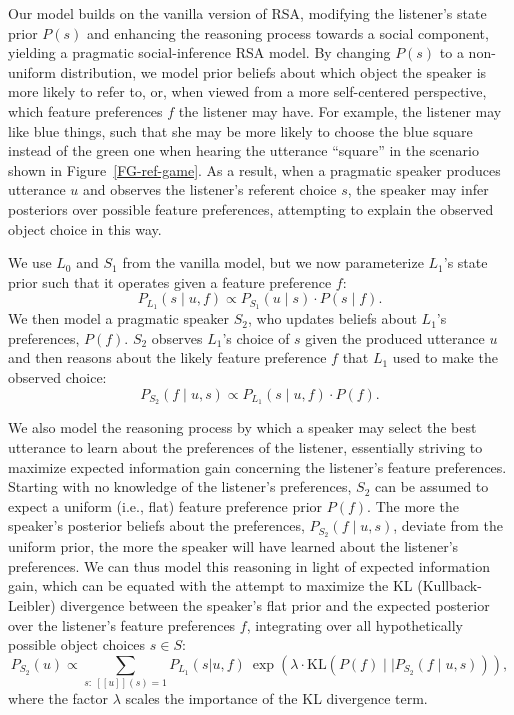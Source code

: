 \documentclass[11pt,a4paper]{article}
\newcommand{\gcs}[1]{\textcolor{blue}{[gcs: #1]}}
\begin{document}
Our model builds on the vanilla version of RSA, modifying the listener's state prior $P(s)$ and enhancing the reasoning process towards a social component, yielding a {pragmatic social-inference RSA} model. %
By changing $P(s)$ to a non-uniform distribution, we model prior beliefs about which object the speaker is more likely to refer to, or, when viewed from a more self-centered perspective, which feature preferences $f$ the listener may have. 
For example, the listener may like blue things, such that she may be more likely to choose the blue square instead of the green one when hearing the utterance ``square'' in the scenario shown in Figure~\ref{FG-ref-game}.
As a result, when a pragmatic speaker produces utterance $u$ and observes the listener's referent choice $s$, the speaker may infer posteriors over possible feature preferences, attempting to explain the observed object choice in this way.


We use $L_0$ and $S_1$ from the vanilla model, but we now parameterize $L_1$'s state prior such that it operates given a feature preference $f$:
\begin{equation}
P_{L_{1}}(s\mid u,f) \propto P_{S_{1}}(u \mid s) \cdot P(s \mid f).
\end{equation}
We then model a pragmatic speaker $S_2$, who updates beliefs about $L_1$'s preferences, $P(f)$.
$S_2$ observes $L_1$'s choice of $s$ given the produced utterance $u$ and then reasons about the likely feature preference $f$ that $L_1$ used to make the observed choice:
\begin{equation}
P_{S_{2}}(f\mid u,s) \propto P_{L_{1}}(s \mid u,f) \cdot P(f).
\end{equation}


We also model the reasoning process by which a speaker may select the best utterance to learn about the preferences of the listener, essentially striving to maximize expected information gain concerning the listener's feature preferences.
Starting with no knowledge of the listener's preferences, $S_2$ can be assumed to expect a uniform (i.e., flat) feature preference prior $P(f)$.
The more the speaker's posterior beliefs about the preferences, $P_{S_{2}}(f\mid u,s)$, deviate from the uniform prior, the more the speaker will have learned about the listener's preferences. 
We can thus model this reasoning in light of expected information gain, which can be equated with the attempt to maximize the KL (Kullback-Leibler) divergence between the speaker's flat prior and the expected posterior over the listener's feature preferences $f$, integrating over all hypothetically possible object choices $s \in S$: %
\begin{equation}
P_{S_2}(u) \propto \sum_{s:\  [\![u]\!](s)=1} P_{L_1}(s|u,f)\ \exp(\lambda \cdot \textrm{KL}(P(f)\mid\mid P_{S_{2}}(f\mid u,s))),
\label{eq:kldivlambda}
\end{equation}
where the factor $\lambda$ scales the importance of the KL divergence term. 
\end{document}
